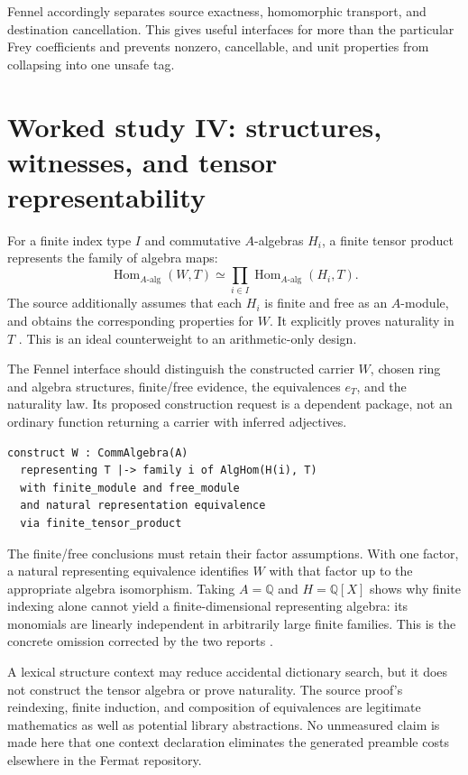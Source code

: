 \documentclass[11pt,a4paper]{article}
\theoremstyle{definition}
\theoremstyle{remark}
\newcommand{\QQ}{\mathbb Q}
\begin{document}
Fennel accordingly separates source exactness, homomorphic transport, and
destination cancellation. This gives useful interfaces for more than the
particular Frey coefficients and prevents nonzero, cancellable, and unit
properties from collapsing into one unsafe tag.

\section{Worked study IV: structures, witnesses, and tensor representability}
\label{sec:tensor}
For a finite index type $I$ and commutative $A$-algebras $H_i$, a finite tensor
product represents the family of algebra maps:
\[
 \operatorname{Hom}_{A\text{-alg}}(W,T)
 \simeq\prod_{i\in I}\operatorname{Hom}_{A\text{-alg}}(H_i,T).
\]
The source additionally assumes that each $H_i$ is finite and free as an
$A$-module, and obtains the corresponding properties for $W$. It explicitly
proves naturality in $T$ \cite{tensor}. This is an ideal counterweight to an
arithmetic-only design.

The Fennel interface should distinguish the constructed carrier $W$, chosen
ring and algebra structures, finite/free evidence, the equivalences $e_T$, and
the naturality law. Its proposed construction request is a dependent package,
not an ordinary function returning a carrier with inferred adjectives.
\begin{lstlisting}
construct W : CommAlgebra(A)
  representing T |-> family i of AlgHom(H(i), T)
  with finite_module and free_module
  and natural representation equivalence
  via finite_tensor_product
\end{lstlisting}
The finite/free conclusions must retain their factor assumptions. With one
factor, a natural representing equivalence identifies $W$ with that factor up
to the appropriate algebra isomorphism. Taking $A=\QQ$ and $H=\QQ[X]$ shows why
finite indexing alone cannot yield a finite-dimensional representing algebra:
its monomials are linearly independent in arbitrarily large finite families.
This is the concrete omission corrected by the two reports \cite{synA,synB}.

A lexical structure context may reduce accidental dictionary search, but it
does not construct the tensor algebra or prove naturality. The source proof's
reindexing, finite induction, and composition of equivalences are legitimate
mathematics as well as potential library abstractions. No unmeasured claim is
made here that one context declaration eliminates the generated preamble costs
elsewhere in the Fermat repository.
\end{document}
